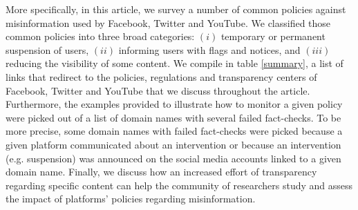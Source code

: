 \documentclass{article}
\begin{document}
\smallskip

More specifically, in this article, we survey a number of common policies against misinformation used by Facebook, Twitter and YouTube. We classified those common policies into three broad categories: $(i)$ temporary or permanent suspension of users, $(ii)$ 
informing users with flags and notices, and $(iii)$ reducing the visibility of some content. We compile in table \ref{summary}, a list of links that redirect to the policies, regulations and transparency centers of Facebook, Twitter and YouTube that we discuss throughout the article. Furthermore, the examples provided to illustrate how to monitor a given policy were picked out of a list of domain names with several failed fact-checks. To be more precise, some domain names with failed fact-checks were picked because a given platform communicated about an intervention or because an intervention (e.g. suspension) was announced on the social media accounts linked to a given domain name. Finally, we discuss how an increased effort of transparency regarding specific content can help the community of researchers study and assess the impact of platforms' policies regarding misinformation. 

\smallskip 




\end{document}
